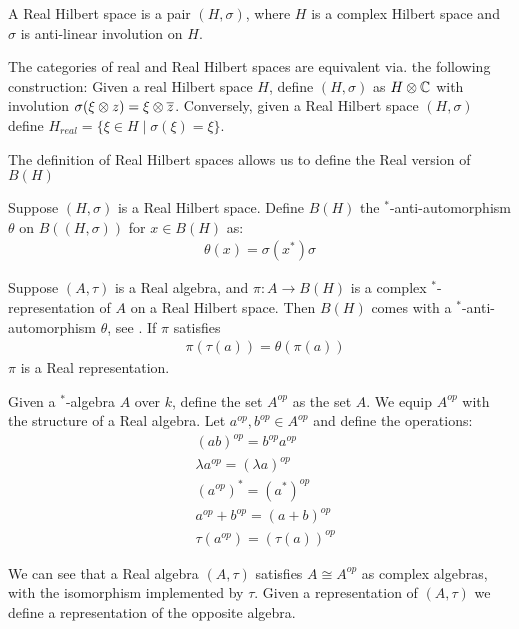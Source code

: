 \begin{definition}\label{realhilbertspace}
	A Real Hilbert space is a pair $(H,\sigma)$, where $H$ is a complex Hilbert space and $\sigma$ is anti-linear involution on $H$. 
\end{definition}
\begin{remark}
	The categories of real and Real Hilbert spaces are equivalent via. the following construction:
	Given a real Hilbert space $H$, define $(H,\sigma)$ as $H\otimes \mathbb{C}$ with involution $\sigma(\xi\otimes z)=\xi \otimes \overline{z}$. 
	Conversely, given a Real Hilbert space $(H,\sigma)$ define $H_{real}=\{\xi \in H \mid \sigma(\xi)=\xi \}$.
\end{remark}
The definition of Real Hilbert spaces allows us to define the Real version of $B(H)$
\begin{definition}\label{realhilbert}
	Suppose $(H,\sigma)$ is a Real Hilbert space. Define $B(H)$ the $^*$-anti-automorphism $\theta$ on $B((H,\sigma))$ for $x\in B(H)$ as: 
\begin{align*}
	\theta(x)=\sigma(x^*)\sigma
\end{align*}
\end{definition}
\begin{definition}
	Suppose $(A,\tau)$ is a Real \Cstar algebra, and $\pi:A\to B(H)$ is a complex $^*$-representation of $A$ on a Real Hilbert space. Then $B(H)$ comes with a $^*$-anti-automorphism $\theta$, see . 
	If $\pi$ satisfies
	\begin{align*}
		&\pi(\tau(a))=\theta(\pi(a))
	\end{align*}
	$\pi$ is a Real representation. 
\end{definition}
\begin{definition}
	Given a $^*$-algebra $A$ over $k$, define the set $A^{op}$ as the set $A$. We equip $A^{op}$ with the structure of a Real algebra. Let $a^{op}, b^{op}\in A^{op}$ and define the operations: 
	\begin{align*}
		&(ab)^{op}=b^{op}a^{op} \\
		&\lambda a^{op}=(\lambda a)^{op} \\
		&(a^{op})^*=(a^*)^{op} \\
		&a^{op}+b^{op}=(a+b)^{op} \\
		&\tau(a^{op})=(\tau(a))^{op}
	\end{align*}
\end{definition}
We can see that a Real \Cstar algebra $(A,\tau)$ satisfies $A\cong A^{op}$ as complex algebras, with the isomorphism implemented by $\tau$. Given a representation of $(A,\tau)$ we  define a representation of the opposite algebra. 
